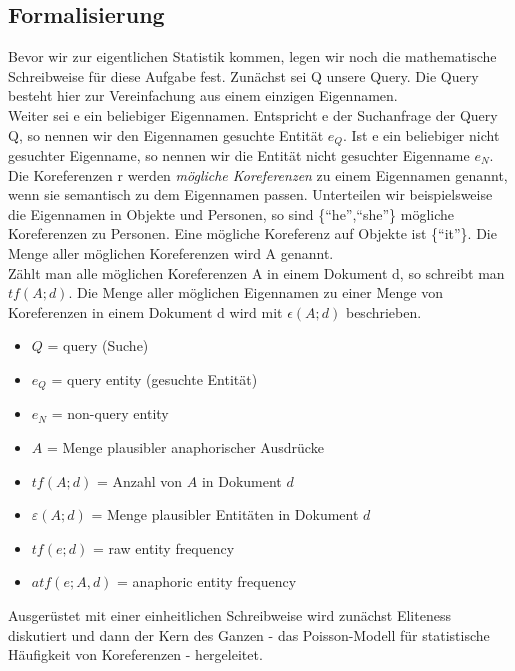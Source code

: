 \subsection{Formalisierung}
Bevor wir zur eigentlichen Statistik kommen, legen wir noch die mathematische Schreibweise für diese Aufgabe fest.
Zunächst sei Q unsere Query. Die Query besteht hier zur Vereinfachung aus einem einzigen Eigennamen.\\
Weiter sei e ein beliebiger Eigennamen. Entspricht e der Suchanfrage der Query Q, so nennen wir den Eigennamen gesuchte Entität $e_Q$. Ist e ein beliebiger nicht gesuchter Eigenname, so nennen wir die Entität nicht gesuchter Eigenname $e_N$.\\
Die Koreferenzen r werden \textit{mögliche Koreferenzen} zu einem Eigennamen genannt, wenn sie semantisch zu dem Eigennamen passen. Unterteilen wir beispielsweise die Eigennamen in Objekte und Personen, so sind \{``he'',``she''\} mögliche Koreferenzen zu Personen. Eine mögliche Koreferenz auf Objekte ist \{``it''\}. Die Menge aller möglichen Koreferenzen wird A genannt.\\
Zählt man alle möglichen Koreferenzen A in einem Dokument d, so schreibt man $tf\left( A;d \right)$. Die Menge aller möglichen Eigennamen zu einer Menge von Koreferenzen in einem Dokument d wird mit $\epsilon\left( A;d \right)$ beschrieben.


 \begin{itemize}
	\item $Q$ = query (Suche)
	\item $e_Q$ = query entity (gesuchte Entität)
	\item $e_N$ = non-query entity
	\item $A$ = Menge plausibler anaphorischer Ausdrücke
	\item $tf(A;d)$ = Anzahl von $A$ in Dokument $d$
	\item $\varepsilon (A;d)$ = Menge plausibler Entitäten in Dokument $d$
	\item $tf(e;d)$ = raw entity frequency
	\item $atf(e;A,d)$ = anaphoric entity frequency
  \end{itemize}

  Ausgerüstet mit einer einheitlichen Schreibweise wird zunächst Eliteness diskutiert und dann der Kern des Ganzen - das Poisson-Modell für statistische Häufigkeit von Koreferenzen - hergeleitet.
